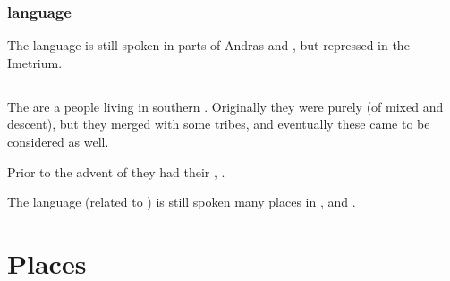 \subsection{\Samurin{} language}
The \Samurin{} language is still spoken in parts of Andras and , but repressed in the Imetrium. 















\section{\Tepharites}
\index{\Tepharite}
The \Tepharites{} are a people living in southern . 
Originally they were purely \scathae{} (of mixed  and  descent), but they merged with some \human{} tribes, and eventually these came to be considered \Tepharites{} as well. 

Prior to the advent of  they had their , . 

The \Tepharin{} language (related to ) is still spoken many places in ,  and . 
\also{\Tepharae}







































\chapter{Places}















